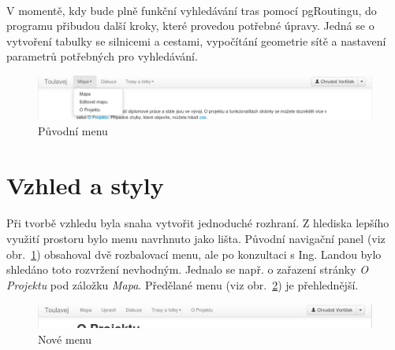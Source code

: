 \documentclass[11pt,a4paper,titlepage,oneside]{book}
\begin{document}
			\paragraph{} V momentě, kdy bude plně funkční vyhledávání tras pomocí pgRoutingu, do programu přibudou další kroky, které provedou potřebné úpravy. Jedná se o vytvoření tabulky se silnicemi a cestami, vypočítání geometrie sítě a nastavení parametrů potřebných pro vyhledávání.

		\begin{figure}[!h]
			\begin{center}
				\includegraphics[width=12cm]{obrazky/toulavej/menu_puv.png}
				\caption{Původní menu}
				\label{fig:menu_puv}
			\end{center}
		\end{figure}	

		\section{Vzhled a styly}


			\paragraph{} Při tvorbě vzhledu byla snaha vytvořit jednoduché rozhraní. Z hlediska lepšího využití prostoru bylo menu navrhnuto jako lišta. Původní navigační panel (viz obr.~\ref{fig:menu_puv}) obsahoval dvě rozbalovací menu, ale po konzultaci s Ing. Landou bylo shledáno toto rozvržení nevhodným. Jednalo se např. o zařazení stránky \textit{O Projektu} pod záložku \textit{Mapa}. Předělané menu (viz obr.~\ref{fig:menu_nove}) je přehlednější.
		\begin{figure}[!h]
			\begin{center}
				\includegraphics[width=12cm]{obrazky/toulavej/menu_nove.png}
				\caption{Nové menu}
				\label{fig:menu_nove}
			\end{center}
		\end{figure}	
\end{document}
